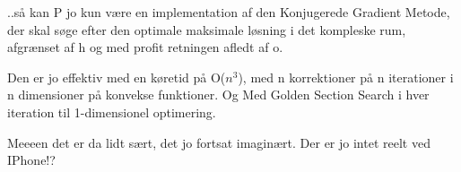 \documentclass[a4paper,11pt]{article}
\begin{document}
\begin{sketch}
 ..så kan P jo kun være en implementation af den Konjugerede
  Gradient Metode, der skal søge efter den optimale maksimale løsning i det
  kompleske rum, afgrænset af h og med profit retningen afledt af
  o. 

 Den er jo effektiv med en køretid på O($n^3$), 
  med n korrektioner på n iterationer i n dimensioner på konvekse
  funktioner. 
 Og Med Golden Section Search i hver iteration til
1-dimensionel optimering. 

 Meeeen det er da lidt sært, det jo fortsat imaginært. 
 Der er jo intet reelt ved IPhone!?









\end{sketch}
\end{document}
